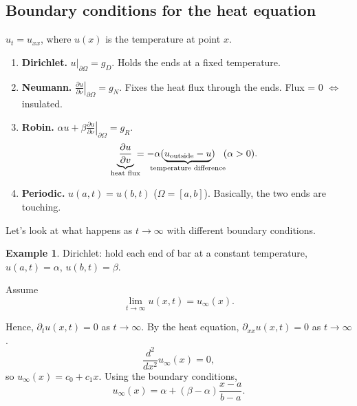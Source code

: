 \documentclass[12pt]{article}
\theoremstyle{definition}
\newtheorem*{example*}{Example}
\begin{document}
\subsection{Boundary conditions for the heat equation}
$u_t=u_{xx}$, where $u(x)$ is the temperature at point $x$.

\begin{enumerate}[label=(\alph*)]
\item\label{Dirichlet} \textbf{Dirichlet.} $u|_{\partial\Omega}=g_D$. Holds the ends at a fixed temperature.

\item\label{Neumann} \textbf{Neumann.} $\left.\frac{\partial u}{\partial\nu}\right|_{\partial\Omega}=g_N$. Fixes the heat flux through the ends. Flux = 0 $\Leftrightarrow$ insulated.

\item \textbf{Robin.} $\alpha u+\beta\left.\frac{\partial u}{\partial\nu}\right|_{\partial\Omega}=g_R$.
\[\underbrace{\frac{\partial u}{\partial v}}_{\mathclap{\text{heat flux}}}=-\alpha(\underbrace{u_{\text{outside}}-u}_{\mathclap{\text{temperature difference}}})\hspace{3mm}(\alpha>0).\]

\item \textbf{Periodic.} $u(a,t)=u(b,t)$ ($\Omega=[a,b]$). Basically, the two ends are touching.
\end{enumerate}

Let's look at what happens as $t\to\infty$ with different boundary conditions.

\begin{example*}
Dirichlet: hold each end of bar at a constant temperature, $u(a,t)=\alpha$, $u(b,t)=\beta$.

Assume
\[\lim_{t\to\infty}u(x,t)=u_{\infty}(x).\]

Hence, $\partial_tu(x,t)=0$ as $t\to\infty$. By the heat equation, $\partial_{xx}u(x,t)=0$ as $t\to\infty$.
\[\frac{d^2}{dx^2}u_{\infty}(x)=0,\]
so $u_{\infty}(x)=c_0+c_1x$. Using the boundary conditions,
\[u_{\infty}(x)=\alpha+(\beta-\alpha)\frac{x-a}{b-a}.\]
\end{example*}
\end{document}
